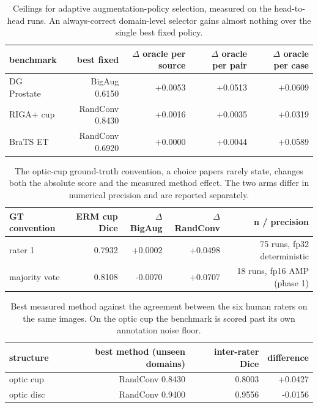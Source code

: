 \begin{table}[t]
\centering
\caption{Ceilings for adaptive augmentation-policy selection, measured on the head-to-head runs. An always-correct domain-level selector gains almost nothing over the single best fixed policy.}
\label{tab:oracle}
\scriptsize
\setlength{\tabcolsep}{2pt}
\renewcommand{\arraystretch}{1.05}
\begin{tabular}{lrrrr}
\hline
benchmark & best fixed & $\Delta$ oracle per source & $\Delta$ oracle per pair & $\Delta$ oracle per case \\
\hline
DG Prostate & BigAug 0.6150 & +0.0053 & +0.0513 & +0.0609 \\
RIGA+ cup & RandConv 0.8430 & +0.0016 & +0.0035 & +0.0319 \\
BraTS ET & RandConv 0.6920 & +0.0000 & +0.0044 & +0.0589 \\
\hline
\end{tabular}
\end{table}

\begin{table}[t]
\centering
\caption{The optic-cup ground-truth convention, a choice papers rarely state, changes both the absolute score and the measured method effect. The two arms differ in numerical precision and are reported separately.}
\label{tab:rater}
\scriptsize
\setlength{\tabcolsep}{2pt}
\renewcommand{\arraystretch}{1.05}
\begin{tabular}{lrrrr}
\hline
GT convention & ERM cup Dice & $\Delta$BigAug & $\Delta$RandConv & n / precision \\
\hline
rater 1 & 0.7932 & +0.0002 & +0.0498 & 75 runs, fp32 deterministic \\
majority vote & 0.8108 & -0.0070 & +0.0707 & 18 runs, fp16 AMP (phase 1) \\
\hline
\end{tabular}
\end{table}

\begin{table}[t]
\centering
\caption{Best measured method against the agreement between the six human raters on the same images. On the optic cup the benchmark is scored past its own annotation noise floor.}
\label{tab:saturation}
\scriptsize
\setlength{\tabcolsep}{2pt}
\renewcommand{\arraystretch}{1.05}
\begin{tabular}{lrrr}
\hline
structure & best method (unseen domains) & inter-rater Dice & difference \\
\hline
optic cup & RandConv 0.8430 & 0.8003 & +0.0427 \\
optic disc & RandConv 0.9400 & 0.9556 & -0.0156 \\
\hline
\end{tabular}
\end{table}

